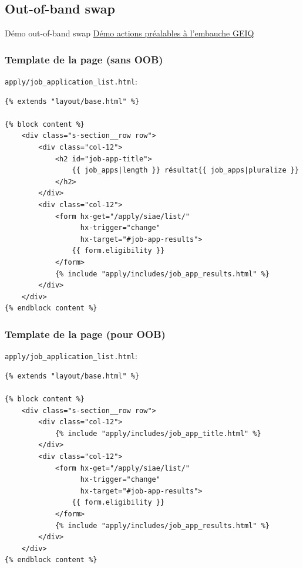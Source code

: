 \documentclass{beamer}
\begin{document}
\subsection*{Out-of-band swap}

\begin{frame}{Démo out-of-band swap}
    \href{https://demo.emplois.inclusion.beta.gouv.fr/}{Démo actions préalables à l'embauche GEIQ}
\end{frame}

\begin{frame}[fragile]
    \frametitle{Template de la page (sans OOB)}

    \texttt{apply/job\_application\_list.html}:

    \begin{verbatim}
{% extends "layout/base.html" %}

{% block content %}
    <div class="s-section__row row">
        <div class="col-12">
            <h2 id="job-app-title">
                {{ job_apps|length }} résultat{{ job_apps|pluralize }}
            </h2>
        </div>
        <div class="col-12">
            <form hx-get="/apply/siae/list/"
                  hx-trigger="change"
                  hx-target="#job-app-results">
                {{ form.eligibility }}
            </form>
            {% include "apply/includes/job_app_results.html" %}
        </div>
    </div>
{% endblock content %}
    \end{verbatim}
\end{frame}

\begin{frame}[fragile]
    \frametitle{Template de la page (pour OOB)}

    \texttt{apply/job\_application\_list.html}:

    \begin{verbatim}
{% extends "layout/base.html" %}

{% block content %}
    <div class="s-section__row row">
        <div class="col-12">
            {% include "apply/includes/job_app_title.html" %}
        </div>
        <div class="col-12">
            <form hx-get="/apply/siae/list/"
                  hx-trigger="change"
                  hx-target="#job-app-results">
                {{ form.eligibility }}
            </form>
            {% include "apply/includes/job_app_results.html" %}
        </div>
    </div>
{% endblock content %}
    \end{verbatim}
\end{frame}
\end{document}

